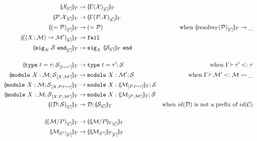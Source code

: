 \begin{align*}
  \Oenrich{\E}{\iC}{\iX}
  &\to \Oenrich{\E}{\iC}{\lookup{\E}{\iX}}\\
  \Oenrich{\E}{\iC}{\iP.\iX}
  &\to \Oenrich{\E}{\iC}{\lookup{\E}{\iP.\iX}}\\
  \Oenrich{\E}{\iC}{\Salias{\iP}}
  &\to \Salias{\iP} &\text{when } \Oenrich{\E}{\iC}{\resolve{\E}{\iP}}\to \_\\
  \Oenrich{\E}{\iC}{(\Sfunctor{\ix}{\iM}{\iM'})}
  &\to \texttt{fail}\\
  \Oenrich{\E}{\iC}{\Ssig{\ix}{\iS}}
  &\to \Ssig{\ix}{\Oenrich{\E}{\iC}{\iS}}\\[4mm]
  \Oenrich{\E}{t = \tau'}{\Stype{t}{\tau};\iS}
  &\to \Stype{t}{\tau'};\iS
  &\text{when } \subtyp{\E}{\tau'}{\tau}\\
  \Oenrich{\E}{\ix : \iM'}{\Smodulety{\ix}{\iM};\iS}
  &\to \Smodulety{\ix}{\iM'};\iS
  &\text{when } \submod{\E}{\iM'}{\iM}{\_}\\
  \Oenrich{\E}{\ix.\ip.t = \tau}{\Smodulety{\ix}{\iM};\iS}
  &\to \Smodulety{\ix}{\Oenrich{\E}{\ip.t = \tau}{\iM}};\iS\\
  \Oenrich{\E}{\ix.\ip : \iM'}{\Smodulety{\ix}{\iM};\iS}
  &\to \Smodulety{\ix}{\Oenrich{\E}{\ip : \iM'}{\iM}};\iS\\
  \Oenrich{\E}{\iC}{(\iD;\iS)}
  &\to \iD;\Oenrich{\E}{\iC}{\iS}
  &\text{when } id(\iD) \text{ is not a prefix of } id(\iC)\\[4mm]
  \Oenrich{\E}{\iC}{(\Sstrengthen{\ip}{\iM})}
  &\to \Oenrich{\E}{\iC}{\Ostrengthen{\E}{\ip}{\iM}}\\
  \Oenrich{\E}{\iC}{\Senrich{\iC'}{\iM}}
  &\to \Oenrich{\E}{\iC}{\Oenrich{\E}{\iC'}{\iM}}\\
\end{align*}\vspace{-3mm}


